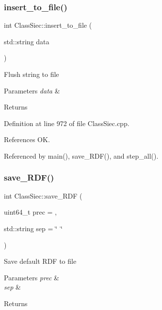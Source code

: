 \subsubsection{\texorpdfstring{insert\+\_\+to\+\_\+file()}{insert\_to\_file()}}
{\footnotesize\ttfamily int Class\+Siec\+::insert\+\_\+to\+\_\+file (\begin{DoxyParamCaption}\item[{std\+::string}]{data }\end{DoxyParamCaption})}

Flush string to file 
\begin{DoxyParams}{Parameters}
{\em data} & \\
\hline
\end{DoxyParams}
\begin{DoxyReturn}{Returns}

\end{DoxyReturn}


Definition at line 972 of file Class\+Siec.\+cpp.



References OK.



Referenced by main(), save\+\_\+\+R\+D\+F(), and step\+\_\+all().

\mbox{\label{classClassSiec_a984c7c1d77c9cf78b6254529088028a4}} 
\subsubsection{\texorpdfstring{save\+\_\+\+R\+D\+F()}{save\_RDF()}}
{\footnotesize\ttfamily int Class\+Siec\+::save\+\_\+\+R\+DF (\begin{DoxyParamCaption}\item[{uint64\+\_\+t}]{prec = {},  }\item[{std\+::string}]{sep = {\ttfamily \char`\"{}~\char`\"{}} }\end{DoxyParamCaption})}

Save default R\+DF to file 
\begin{DoxyParams}{Parameters}
{\em prec} & \\
\hline
{\em sep} & \\
\hline
\end{DoxyParams}
\begin{DoxyReturn}{Returns}

\end{DoxyReturn}


